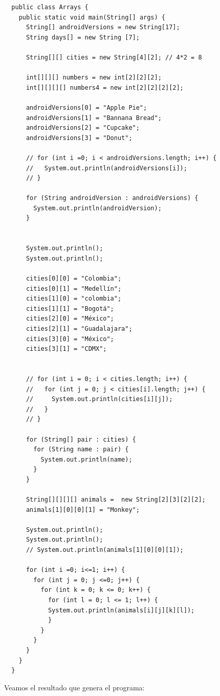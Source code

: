 \documentclass{article}
\begin{document}
\begin{verbatim}
  public class Arrays {
    public static void main(String[] args) {
      String[] androidVersions = new String[17];
      String days[] = new String [7];

      String[][] cities = new String[4][2]; // 4*2 = 8

      int[][][] numbers = new int[2][2][2];
      int[][][][] numbers4 = new int[2][2][2][2];

      androidVersions[0] = "Apple Pie";
      androidVersions[1] = "Bannana Bread";
      androidVersions[2] = "Cupcake";
      androidVersions[3] = "Donut";

      // for (int i =0; i < androidVersions.length; i++) {
      //   System.out.println(androidVersions[i]);
      // }

      for (String androidVersion : androidVersions) {
        System.out.println(androidVersion);
      }


      System.out.println();
      System.out.println();

      cities[0][0] = "Colombia";
      cities[0][1] = "Medellín";
      cities[1][0] = "colombia";
      cities[1][1] = "Bogotá";
      cities[2][0] = "México";
      cities[2][1] = "Guadalajara";
      cities[3][0] = "México";
      cities[3][1] = "CDMX";


      // for (int i = 0; i < cities.length; i++) {
      //   for (int j = 0; j < cities[i].length; j++) {
      //     System.out.println(cities[i][j]);
      //   }
      // }

      for (String[] pair : cities) {
        for (String name : pair) {
          System.out.println(name);
        }
      }

      String[][][][] animals =  new String[2][3][2][2];
      animals[1][0][0][1] = "Monkey";

      System.out.println();
      System.out.println();
      // System.out.println(animals[1][0][0][1]);

      for (int i =0; i<=1; i++) {
        for (int j = 0; j <=0; j++) {
          for (int k = 0; k <= 0; k++) {
            for (int l = 0; l <= 1; l++) {
            System.out.println(animals[i][j][k][l]);
            }
          }
        }
      }
    }
  }
\end{verbatim}

\newpage

Veamos el resultado que genera el programa:\\
\end{document}
